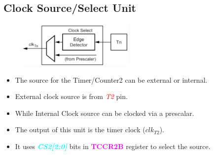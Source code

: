 \documentclass{article}
\newcommand{\bitFormat}[1]{\emph{\textbf{\textcolor{cyan}{#1}}}}
\newcommand{\regFormat}[1]{\textbf{\textcolor{magenta}{#1}}}
\newcommand{\pinFormat}[1]{\emph{\textcolor{red}{#1}}}
\begin{document}
\subsection{Clock Source/Select Unit}
\begin{figure}[H]
    \begin{center}
        \includegraphics[width=0.5\textwidth]{Timer0ClockSelector.png}
    \end{center}
\end{figure}
\begin{itemize}
    \item The source for the Timer/Counter2 can be external or internal.
    \item External clock source is from \pinFormat{T2} pin.
    \item While Internal Clock source can be clocked via a prescalar.
    \item The output of this unit is the timer clock ($clk_{T2}$).
    \item It uses \bitFormat{CS2[2:0]} bits in \regFormat{TCCR2B} register to select the source.
\end{itemize}
\end{document}
